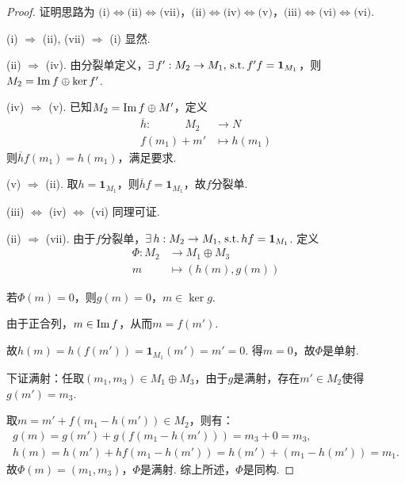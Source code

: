 \begin{proof}
    证明思路为 $\text{(i)} \Leftrightarrow \text{(ii)} \Leftrightarrow \text{(vii)}$，$\text{(ii)} \Leftrightarrow \text{(iv)} \Leftrightarrow \text{(v)}$，$\text{(iii)} \Leftrightarrow \text{(vi)} \Leftrightarrow \text{(vi)}$.
    
    (i) $\Rightarrow$ (ii), (vii) $\Rightarrow$ (i) 显然.
    
    (ii) $\Rightarrow$ (iv). 由分裂单定义，$\exists\, f': M_2 \to M_1, \operatorname{\,\text{s.t.}} f'f = \bm{1}_{M_1}$，则$M_2 = \operatorname{Im} f \oplus \ker f'$.
    
    (iv) $\Rightarrow$ (v). 已知$M_2 = \operatorname{Im} f \oplus M'$，定义
    \begin{align*}
    \overline{h}: \quad\qquad M_2 &\to N \\[-7pt]
    f(m_1) + m' &\mapsto h(m_1)
    \end{align*}
    则$\overline{h} f(m_1) = h(m_1)$，满足要求.
    
    (v) $\Rightarrow$ (ii). 取$h = \bm{1}_{M_1}$，则$\overline{h} f = \bm{1}_{M_1}$，故$f$分裂单.
    
    (iii) $\Leftrightarrow$ (iv) $\Leftrightarrow$ (vi) 同理可证.
    
    (ii) $\Rightarrow$ (vii). 由于$f$分裂单，$\exists\, h: M_2 \to M_1, \operatorname{\,\text{s.t.}} hf = \bm{1}_{M_1}$.
    定义
    \begin{align*}
        \Phi: M_2 &\to M_1 \oplus M_3 \\[-5pt]
        m &\mapsto (h(m), g(m))
    \end{align*}

    若$\Phi(m) = 0$，则$g(m) = 0$，$m \in \ker g$. \par
    由于正合列，$m \in \operatorname{Im} f$，从而$m = f(m')$. \par
        故$h(m) = h(f(m')) = \bm{1}_{M_1}(m') = m' = 0$. 得$m=0$，故$\Phi$是单射.\par
        下证满射：任取$(m_1, m_3) \in M_1 \oplus M_3$，由于$g$是满射，存在$m' \in M_2$使得$g(m') = m_3$. \par
        取$m = m' + f(m_1 - h(m')) \in M_2$，则有：
        \begin{gather*}
            g(m) = g(m') + g(f(m_1 - h(m'))) = m_3 + 0 = m_3, \\[-5pt]
            h(m) = h(m') + hf(m_1 - h(m')) = h(m') + (m_1 - h(m')) = m_1.
        \end{gather*}
        故$\Phi(m) = (m_1, m_3)$，$\Phi$是满射. 综上所述，$\Phi$是同构.
\end{proof}


